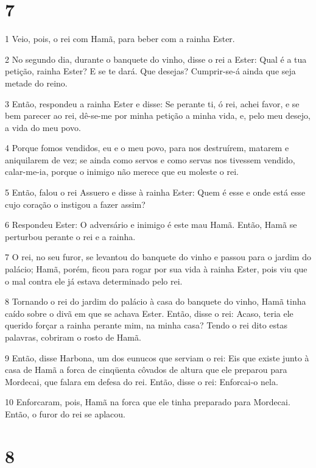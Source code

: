 \chapter{7}

\par 1 Veio, pois, o rei com Hamã, para beber com a rainha Ester.
\par 2 No segundo dia, durante o banquete do vinho, disse o rei a Ester: Qual é a tua petição, rainha Ester? E se te dará. Que desejas? Cumprir-se-á ainda que seja metade do reino.
\par 3 Então, respondeu a rainha Ester e disse: Se perante ti, ó rei, achei favor, e se bem parecer ao rei, dê-se-me por minha petição a minha vida, e, pelo meu desejo, a vida do meu povo.
\par 4 Porque fomos vendidos, eu e o meu povo, para nos destruírem, matarem e aniquilarem de vez; se ainda como servos e como servas nos tivessem vendido, calar-me-ia, porque o inimigo não merece que eu moleste o rei.
\par 5 Então, falou o rei Assuero e disse à rainha Ester: Quem é esse e onde está esse cujo coração o instigou a fazer assim?
\par 6 Respondeu Ester: O adversário e inimigo é este mau Hamã. Então, Hamã se perturbou perante o rei e a rainha.
\par 7 O rei, no seu furor, se levantou do banquete do vinho e passou para o jardim do palácio; Hamã, porém, ficou para rogar por sua vida à rainha Ester, pois viu que o mal contra ele já estava determinado pelo rei.
\par 8 Tornando o rei do jardim do palácio à casa do banquete do vinho, Hamã tinha caído sobre o divã em que se achava Ester. Então, disse o rei: Acaso, teria ele querido forçar a rainha perante mim, na minha casa? Tendo o rei dito estas palavras, cobriram o rosto de Hamã.
\par 9 Então, disse Harbona, um dos eunucos que serviam o rei: Eis que existe junto à casa de Hamã a forca de cinqüenta côvados de altura que ele preparou para Mordecai, que falara em defesa do rei. Então, disse o rei: Enforcai-o nela.
\par 10 Enforcaram, pois, Hamã na forca que ele tinha preparado para Mordecai. Então, o furor do rei se aplacou.

\chapter{8}

